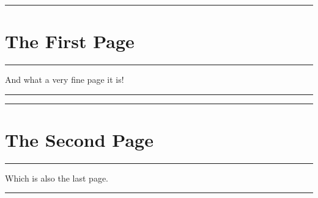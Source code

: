 \documentclass[12pt]{article}
\begin{document}
\hrule
\section*{The First Page}
\hrule
\vfill
And what a very fine page it is!
\vfill
\hrule
\clearpage
\hrule
\section*{The Second Page}
\hrule
\vfill
Which is also the last page.
\vfill
\hrule
\end{document}
